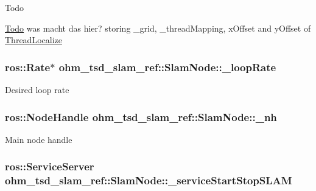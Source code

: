 \begin{DoxyRefDesc}{Todo}
\item[\hyperlink{todo__todo000013}{Todo}]was macht das hier? storing \-\_\-grid, \-\_\-thread\-Mapping, x\-Offset and y\-Offset of \hyperlink{classohm__tsd__slam__ref_1_1ThreadLocalize}{Thread\-Localize} \end{DoxyRefDesc}
\hypertarget{classohm__tsd__slam__ref_1_1SlamNode_a09e9b76d84f565257c0aacda187c82ec}{
\subsubsection[{\-\_\-loop\-Rate}]{\setlength{\rightskip}{0pt plus 5cm}ros\-::\-Rate$\ast$ ohm\-\_\-tsd\-\_\-slam\-\_\-ref\-::\-Slam\-Node\-::\-\_\-loop\-Rate\hspace{0.3cm}{\ttfamily [private]}}}\label{classohm__tsd__slam__ref_1_1SlamNode_a09e9b76d84f565257c0aacda187c82ec}
Desired loop rate \hypertarget{classohm__tsd__slam__ref_1_1SlamNode_a2e2b86d2d3ddff889a33152197e42894}{
\subsubsection[{\-\_\-nh}]{\setlength{\rightskip}{0pt plus 5cm}ros\-::\-Node\-Handle ohm\-\_\-tsd\-\_\-slam\-\_\-ref\-::\-Slam\-Node\-::\-\_\-nh\hspace{0.3cm}{\ttfamily [private]}}}\label{classohm__tsd__slam__ref_1_1SlamNode_a2e2b86d2d3ddff889a33152197e42894}
Main node handle \hypertarget{classohm__tsd__slam__ref_1_1SlamNode_a2941b11fc25f02fad3467297f0260fec}{
\subsubsection[{\-\_\-service\-Start\-Stop\-S\-L\-A\-M}]{\setlength{\rightskip}{0pt plus 5cm}ros\-::\-Service\-Server ohm\-\_\-tsd\-\_\-slam\-\_\-ref\-::\-Slam\-Node\-::\-\_\-service\-Start\-Stop\-S\-L\-A\-M\hspace{0.3cm}{\ttfamily [private]}}}\label{classohm__tsd__slam__ref_1_1SlamNode_a2941b11fc25f02fad3467297f0260fec}
